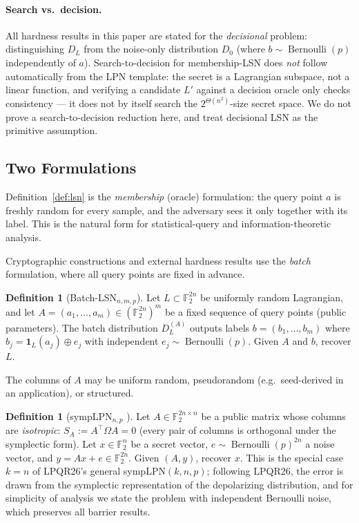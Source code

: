 \documentclass[11pt,a4paper]{article}
\theoremstyle{plain}
\theoremstyle{definition}
\newtheorem{definition}[theorem]{Definition}
\newcommand{\F}{\mathbb{F}}
\begin{document}
\paragraph{Search vs.~decision.} All hardness results in this paper are stated for the \emph{decisional} problem: distinguishing $D_L$ from the noise-only distribution $D_0$ (where $b \sim \operatorname{Bernoulli}(p)$ independently of $a$). Search-to-decision for membership-LSN does \emph{not} follow automatically from the LPN template: the secret is a Lagrangian subspace, not a linear function, and verifying a candidate $L'$ against a decision oracle only checks consistency --- it does not by itself search the $2^{\Theta(n^2)}$-size secret space. We do not prove a search-to-decision reduction here, and treat decisional LSN as the primitive assumption.

\subsection{Two Formulations}
\label{subsec:two-forms}

Definition~\ref{def:lsn} is the \emph{membership} (oracle) formulation: the query point $a$ is freshly random for every sample, and the adversary sees it only together with its label. This is the natural form for statistical-query and information-theoretic analysis.

Cryptographic constructions and external hardness results use the \emph{batch} formulation, where all query points are fixed in advance.

\begin{definition}[Batch-LSN$_{n,m,p}$]
\label{def:lsn-batch}
Let $L \subset \F_2^{2n}$ be uniformly random Lagrangian, and let $A = (a_1,\dots,a_m) \in (\F_2^{2n})^m$ be a fixed sequence of query points (public parameters). The batch distribution $D_L^{(A)}$ outputs labels $b = (b_1,\dots,b_m)$ where $b_j = \mathbf{1}_L(a_j) \oplus e_j$ with independent $e_j \sim \operatorname{Bernoulli}(p)$. Given $A$ and $b$, recover $L$.
\end{definition}

The columns of $A$ may be uniform random, pseudorandom (e.g.\ seed-derived in an application), or structured.

\begin{definition}[sympLPN$_{n,p}$ \cite{KLP+25,LPQR26}]
\label{def:symplpn}
Let $A \in \F_2^{2n \times n}$ be a public matrix whose columns are \emph{isotropic}: $S_A := A^{\top}\Omega A = 0$ (every pair of columns is orthogonal under the symplectic form). Let $x \in \F_2^n$ be a secret vector, $e \sim \operatorname{Bernoulli}(p)^{2n}$ a noise vector, and $y = Ax + e \in \F_2^{2n}$. Given $(A,y)$, recover $x$.
This is the special case $k=n$ of LPQR26's general sympLPN$(k,n,p)$; following LPQR26, the error is drawn from the symplectic representation of the depolarizing distribution, and for simplicity of analysis we state the problem with independent Bernoulli noise, which preserves all barrier results.
\end{definition}
\end{document}
